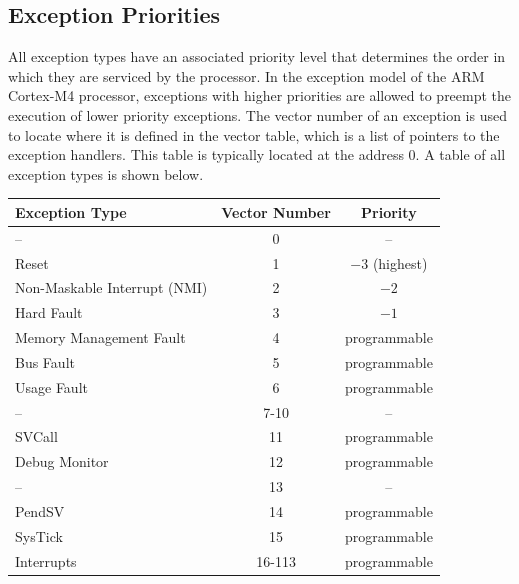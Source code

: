 \documentclass{article}
\begin{document}
\subsection{Exception Priorities}
All exception types have an associated priority level that determines
the order in which they are serviced by the processor. In the exception
model of the ARM Cortex-M4 processor, exceptions with higher priorities
are allowed to preempt the execution of lower priority exceptions. The
vector number of an exception is used to locate where it is defined in
the vector table, which is a list of pointers to the exception
handlers. This table is typically located at the address 0. A table of
all exception types is shown below.
\begin{table}[H]
    \centering
    \begin{tabular}{lcc}
        \toprule
        \textbf{Exception Type}      & \textbf{Vector Number} & \textbf{Priority} \\
        \midrule
        --                           & 0                      & --                \\
        Reset                        & 1                      & \(-3\) (highest)  \\
        Non-Maskable Interrupt (NMI) & 2                      & \(-2\)            \\
        Hard Fault                   & 3                      & \(-1\)            \\
        Memory Management Fault      & 4                      & programmable      \\
        Bus Fault                    & 5                      & programmable      \\
        Usage Fault                  & 6                      & programmable      \\
        --                           & 7-10                   & --                \\
        SVCall                       & 11                     & programmable      \\
        Debug Monitor                & 12                     & programmable      \\
        --                           & 13                     & --                \\
        PendSV                       & 14                     & programmable      \\
        SysTick                      & 15                     & programmable      \\
        Interrupts                   & 16-113                 & programmable      \\
        \bottomrule
    \end{tabular}
\end{table}
\end{document}
